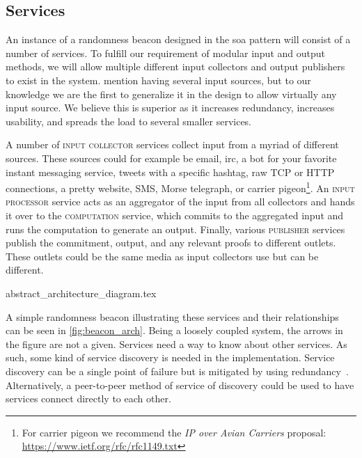 \subsection{Services}%
\label{sub:components_of_a_beacon}
An instance of a randomness beacon designed in the \gls{soa} pattern will consist of a number of services.
To fulfill our requirement of modular input and output methods, we will allow multiple different input collectors and output publishers to exist in the system.
\citet{randomzoo} mention having several input sources, but to our knowledge we are the first to generalize it in the design to allow virtually any input source.
We believe this is superior as it increases redundancy, increases usability, and spreads the load to several smaller services.

A number of \textsc{input collector} services collect input from a myriad of different sources.
These sources could for example be email, irc, a bot for your favorite instant messaging service, tweets with a specific hashtag, raw TCP or HTTP connections, a pretty website, SMS, Morse telegraph, or carrier pigeon\footnote{For carrier pigeon we recommend the \emph{IP over Avian Carriers} proposal: \url{https://www.ietf.org/rfc/rfc1149.txt}}.
An \textsc{input processor} service acts as an aggregator of the input from all collectors and hands it over to the \textsc{computation} service, which commits to the aggregated input and runs the computation to generate an output.
Finally, various \textsc{publisher} services publish the commitment, output, and any relevant proofs to different outlets.
These outlets could be the same media as input collectors use but can be different.

{abstract_architecture_diagram.tex}

A simple randomness beacon illustrating these services and their relationships can be seen in \cref{fig:beacon_arch}.
Being a loosely coupled system, the arrows in the figure are not a given.
Services need a way to know about other services.
As such, some kind of service discovery is needed in the implementation.
Service discovery can be a single point of failure but is mitigated by using redundancy~\cite{soa_redundancy}.
Alternatively, a peer-to-peer method of service of discovery could be used to have services connect directly to each other.

